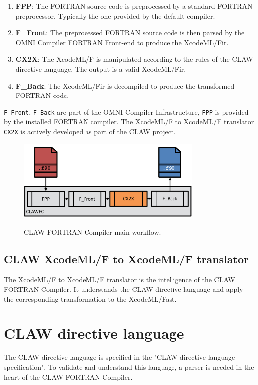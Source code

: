 \documentclass[a4paper, 11pt]{report}
\def\clawfcomp{CLAW FORTRAN Compiler\xspace}
\def\omni{OMNI Compiler Infrastructure\xspace}
\def\xcodeml{XcodeML/F\xspace}
\def\ffront{\lstinline!F_Front!\xspace}
\def\fback{\lstinline!F_Back!\xspace}
\def\fpp{\lstinline!FPP!\xspace}
\def\cx2x{\lstinline!CX2X!\xspace}
\begin{document}
\begin{enumerate}
\item \textbf{FPP}: The FORTRAN source code is preprocessed by a standard FORTRAN preprocessor. Typically the one provided by the default compiler. 
\item \textbf{F\_Front}: The preprocessed FORTRAN source code is then parsed by the OMNI Compiler FORTRAN Front-end to produce the \xcodeml \gls{ir}.
\item \textbf{CX2X}: The \xcodeml is manipulated according to the rules of the CLAW directive language. The output is a valid \xcodeml \gls{ir}.
\item \textbf{F\_Back}: The \xcodeml \gls{ir} is decompiled to produce the transformed FORTRAN code. 
\end{enumerate}

\ffront{}, \fback{} are part of the \omni{}, \fpp{} is provided by the installed FORTRAN compiler. The \xcodeml to \xcodeml translator \cx2x{} is actively developed as part of the CLAW project.  

\begin{figure}[!ht]
  \centering
  \includegraphics[width=0.8\textwidth]{resources/clawfc_global_workflow.png} \\
  \caption{CLAW FORTRAN Compiler main workflow.}
  \label{fig:clawfc_main_workflow}
\end{figure}

\section{CLAW \xcodeml to \xcodeml translator}
The \xcodeml to \xcodeml translator is the intelligence of the \clawfcomp. It understands the CLAW directive language and apply the corresponding transformation to the \xcodeml \gls{ast}.

\chapter{CLAW directive language}
The CLAW directive language is specified in the "CLAW directive language specification". To validate and understand this language, a parser is needed in the heart of the \clawfcomp.
\end{document}
